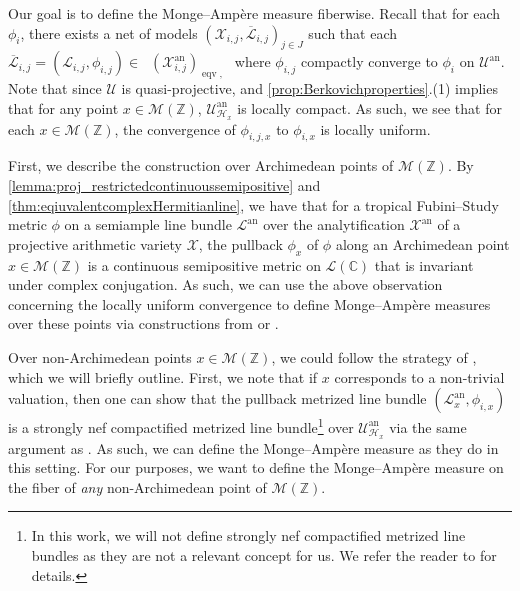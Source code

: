 \documentclass[11pt,reqno]{amsart}
\newcommand{\mZ}{\mathbb{Z}}
\newcommand{\mC}{\mathbb{C}}
\newcommand{\cC}{\mathcal{C}}
\newcommand{\cX}{\mathcal{X}}
\newcommand{\cU}{\mathcal{U}}
\newcommand{\cL}{\mathcal{L}}
\newcommand{\sH}{{\mathscr H}}
\newcommand{\sM}{{\mathscr M}}
\theoremstyle{theorem}
\numberwithin{equation}{subsection}
\numberwithin{equation}{subsection}
\theoremstyle{definition}
\theoremstyle{remark}
\numberwithin{equation}{subsubsection} \numberwithin{figure}{section}
\DeclareMathOperator{\an}{an}
\DeclareMathOperator{\aPic}{\widehat{Pic}}
\DeclareMathOperator{\tFS}{FS^{\tau}}
\DeclareMathOperator{\eqv}{eqv}
\begin{document}
Our goal is to define the Monge--Amp\`ere measure fiberwise. 
Recall that for each $\phi_i$, there exists a net of models $(\cX_{i,j},\overline{\cL}_{i,j})_{j\in J}$ such that each $\overline{\cL}_{i,j} = (\cL_{i,j},\phi_{i,j}) \in \aPic(\cX_{i,j}^{\an})_{\eqv,\tFS}$ where $\phi_{i,j}$ compactly converge to $\phi_i$ on $\cU^{\an}$. 
Note that since $\cU$ is quasi-projective, \cite[\href{https://stacks.math.columbia.edu/tag/0B3G}{Tag 0B3G}]{stacks-project} and \autoref{prop:Berkovichproperties}.(1) implies that for any point $x\in \sM(\mZ)$, $\cU^{\an}_{\sH_x}$ is locally compact. 
As such, we see that for each $x\in \sM(\mZ)$, the convergence of $\phi_{i,j,x}$ to $\phi_{i,x}$ is locally uniform. 


First, we describe the construction over Archimedean points of $\sM(\mZ)$. 
By \autoref{lemma:proj_restrictedcontinuoussemipositive} and  \autoref{thm:eqiuvalentcomplexHermitianline}, we have that for a tropical Fubini--Study metric $\phi$ on a semiample line bundle $\cL^{\an}$ over the analytification $\cX^{\an}$ of a projective arithmetic variety $\cX$, the pullback $\phi_x$ of $\phi$ along an Archimedean point $x\in \sM(\mZ)$ is a continuous semipositive metric on $\cL(\mC)$ that is invariant under complex conjugation. 
As such, we can use the above observation concerning the locally uniform convergence to define Monge--Amp\`ere measures over these points via constructions from \cite[Theorem 2.1]{BedforTaylor:CapacityPSH} or \cite[Corollary 1.6]{Demailly:MAOperators}. 


Over non-Archimedean points $x\in \sM(\mZ)$, we could follow the strategy of \cite[Section 3.6.7]{YuanZhang:AdelicLineBundles}, which we will briefly outline. 
First, we note that if $x$ corresponds to a non-trivial valuation, then one can show that the pullback metrized line bundle $(\cL_x^{\an},\phi_{i,x})$ is a strongly nef compactified metrized line bundle\footnote{In this work, we will not define strongly nef compactified metrized line bundles as they are not a relevant concept for us. We refer the reader to \cite[Section 3.6.6]{YuanZhang:AdelicLineBundles} for details.} over $\cU^{\an}_{\sH_x}$ via the same argument as \cite[Lemma 3.6.7]{YuanZhang:AdelicLineBundles}. As such, we can define the Monge--Amp\`ere measure as they do in this setting. 
For our purposes, we want to define the Monge--Amp\`ere measure on the fiber of \textit{any} non-Archimedean point of $\sM(\mZ)$. 
\end{document}
